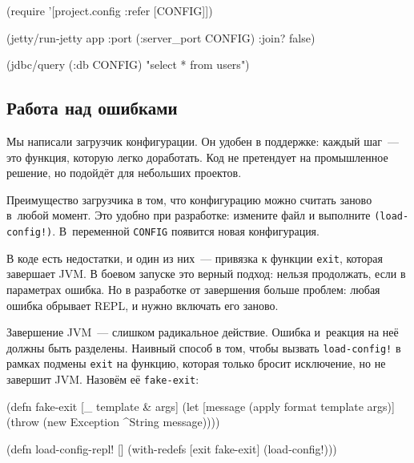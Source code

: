 \else

\begin{english}
  \begin{clojure}
(require '[project.config :refer [CONFIG]])

(jetty/run-jetty app {:port (:server_port CONFIG)
                      :join? false})

(jdbc/query (:db CONFIG) "select * from users")
  \end{clojure}
\end{english}

\fi

\subsection{Работа над ошибками}

Мы написали загрузчик конфигурации. Он удобен в поддержке: каждый шаг~--- это
функция, которую легко доработать. Код не претендует на промышленное решение, но
подойдёт для небольших проектов.

Преимущество загрузчика в том, что конфигурацию можно считать заново в~любой
момент. Это удобно при разработке: измените файл и выполните
\verb|(load-config!)|. В~переменной \verb|CONFIG| появится новая конфигурация.


В коде есть недостатки, и один из них~--- привязка к функции \verb|exit|,
которая завершает JVM. В боевом запуске это верный подход: нельзя продолжать,
если в параметрах ошибка. Но в разработке от завершения больше проблем: любая
ошибка обрывает REPL, и нужно включать его заново.

Завершение JVM~--- слишком радикальное действие. Ошибка и~реакция на неё должны
быть разделены. Наивный способ в том, чтобы вызвать \verb|load-config!| в рамках
подмены \verb|exit| на функцию, которая только бросит исключение, но не завершит
JVM. Назовём её \verb|fake-exit|:






\ifnarrow


\begin{english}
  \begin{clojure}
(defn fake-exit
  [_ template & args]
  (let [message (apply format template args)]
    (throw (new Exception ^String message))))

(defn load-config-repl! []
  (with-redefs [exit fake-exit]
    (load-config!)))
  \end{clojure}
\end{english}

